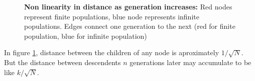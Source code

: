 \begin{figure}[htp]
\begin{center}
\hspace{5pt}
\caption[\textbf{Non linearity in distance as generation increases}]{\textbf{Non linearity in distance as generation increases:} 
Red nodes represent finite populations, blue node represents infinite populations. 
Edges connect one generation to the next (red for finite population, blue for infinite population)}
\label{nonlinear}
\end{center}
\end{figure}
In figure \ref{nonlinear}, distance between the children of any node is aproximately $1/\sqrt{N}$. 
But the distance between descendents $n$ generations later may accumulate to be like $k/\sqrt{N}$. 

